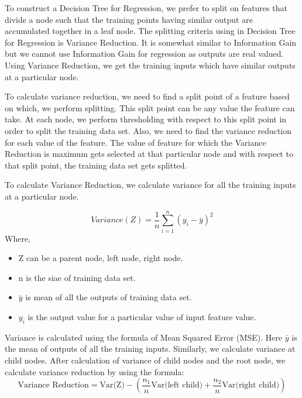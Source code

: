 \documentclass[a4paper,11pt]{article}
\begin{document}
\begin{mlsolution}

To construct a Decision Tree for Regression, we prefer to split on features that divide a node such that the training points having similar output are accumulated together in a leaf node.
The splitting criteria using in Decision Tree for Regression is Variance Reduction. It is somewhat similar to Information Gain but we cannot use Information Gain for regression as outputs are real valued. Using Variance Reduction, we get the training inputs which have similar outputs at a particular node.

To calculate variance reduction, we need to find a split point of a feature based on which, we perform splitting. This split point can be any value the feature can take. At each node, we perform thresholding with respect to this split point in order to split the training data set. Also, we need to find the variance reduction for each value of the feature. The value of feature for which the Variance Reduction is maximum gets selected at that particular node and with respect to that split point, the training data set gets splitted.

To calculate Variance Reduction, we calculate variance for all the training inputs at a particular node.

\begin{equation*}
	\boxed{Variance(Z) = \frac{1}{n} \sum_{i=1}^{n} (y_i - \bar{y})^2}	
\end{equation*}
Where,
\begin{itemize}
	\item Z can be a parent node, left node, right node.
	\item n is the siae of training data set.
	\item $\bar{y}$ is mean of all the outputs of training data set.
	\item $y_i$ is the output value for a particular value of input feature value.
\end{itemize}
Variance is calculated using the formula of Mean Squared Error (MSE). Here $\bar{y}$ is the mean of outputs of all the training inputs. Similarly, we calculate variance at child nodes.
After calculation of variance of child nodes and the root node, we calculate variance reduction by using the formula: 
\begin{equation*}
	\boxed{\text{Variance Reduction} = \text{Var(Z)} - \left(\frac{n_1}{n} \text{Var(left child)} + \frac{n_2}{n} \text{Var(right child)}\right)}
\end{equation*}


\end{mlsolution}
\end{document}
